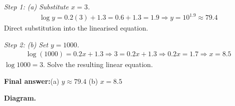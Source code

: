 \documentclass[11pt]{article}
\begin{document}
\textit{Step 1: (a) Substitute \( x = 3 \).}
\[\begin{gathered}
\log y = 0.2(3) + 1.3 = 0.6 + 1.3 = 1.9 \Rightarrow y = 10^{1.9} \approx 79.4
\end{gathered}\]
Direct substitution into the linearised equation.

\textit{Step 2: (b) Set \( y = 1000 \).}
\[\begin{gathered}
\log(1000) = 0.2x + 1.3 \Rightarrow 3 = 0.2x + 1.3 \Rightarrow 0.2x = 1.7 \Rightarrow x = 8.5
\end{gathered}\]
\( \log 1000 = 3 \). Solve the resulting linear equation.

\begin{answerbox}
\textbf{Final answer:}\quad (a) \(\displaystyle  y \approx 79.4 \) \quad  (b) \(\displaystyle  x = 8.5 \)
\end{answerbox}
\textbf{Diagram.}
\end{document}
